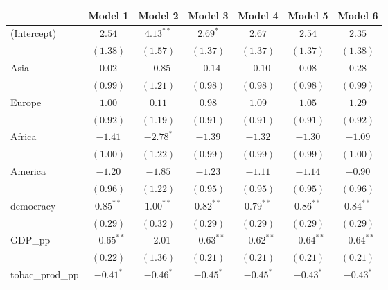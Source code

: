 
\begin{table}[!h]
\begin{center}
\begin{tabular}{l c c c c c c }
\toprule
 & Model 1 & Model 2 & Model 3 & Model 4 & Model 5 & Model 6 \\
\midrule
(Intercept)             & $2.54$       & $4.13^{**}$ & $2.69^{*}$   & $2.67$       & $2.54$       & $2.35$       \\
                        & $(1.38)$     & $(1.57)$    & $(1.37)$     & $(1.37)$     & $(1.37)$     & $(1.38)$     \\
Asia                    & $0.02$       & $-0.85$     & $-0.14$      & $-0.10$      & $0.08$       & $0.28$       \\
                        & $(0.99)$     & $(1.21)$    & $(0.98)$     & $(0.98)$     & $(0.98)$     & $(0.99)$     \\
Europe                  & $1.00$       & $0.11$      & $0.98$       & $1.09$       & $1.05$       & $1.29$       \\
                        & $(0.92)$     & $(1.19)$    & $(0.91)$     & $(0.91)$     & $(0.91)$     & $(0.92)$     \\
Africa                  & $-1.41$      & $-2.78^{*}$ & $-1.39$      & $-1.32$      & $-1.30$      & $-1.09$      \\
                        & $(1.00)$     & $(1.22)$    & $(0.99)$     & $(0.99)$     & $(0.99)$     & $(1.00)$     \\
America                 & $-1.20$      & $-1.85$     & $-1.23$      & $-1.11$      & $-1.14$      & $-0.90$      \\
                        & $(0.96)$     & $(1.22)$    & $(0.95)$     & $(0.95)$     & $(0.95)$     & $(0.96)$     \\
democracy               & $0.85^{**}$  & $1.00^{**}$ & $0.82^{**}$  & $0.79^{**}$  & $0.86^{**}$  & $0.84^{**}$  \\
                        & $(0.29)$     & $(0.32)$    & $(0.29)$     & $(0.29)$     & $(0.29)$     & $(0.29)$     \\
GDP\_pp                 & $-0.65^{**}$ & $-2.01$     & $-0.63^{**}$ & $-0.62^{**}$ & $-0.64^{**}$ & $-0.64^{**}$ \\
                        & $(0.22)$     & $(1.36)$    & $(0.21)$     & $(0.21)$     & $(0.21)$     & $(0.21)$     \\
tobac\_prod\_pp         & $-0.41^{*}$  & $-0.46^{*}$ & $-0.45^{*}$  & $-0.45^{*}$  & $-0.43^{*}$  & $-0.43^{*}$  \\

\end{tabular}
\end{center}
\end{table}
